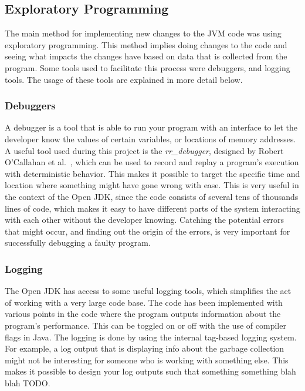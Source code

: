 

\subsection{Exploratory Programming}
The main method for implementing new changes to the JVM code was using exploratory programming. This method implies doing changes to the code and seeing what impacts the changes have based on data that is collected from the program. Some tools used to facilitate this process were debuggers, and logging tools. The usage of these tools are explained in more detail below.
\subsubsection{Debuggers}
A debugger is a tool that is able to run your program with an interface to let the developer know the values of certain variables, or locations of memory addresses. A useful tool used during this project is the \textit{rr\_debugger}, designed by Robert O'Callahan et al.~\cite{rrdebugger}, which can be used to record and replay a program's execution with deterministic behavior. This makes it possible to target the specific time and location where something might have gone wrong with ease. This is very useful in the context of the Open JDK, since the code consists of several tens of thousands lines of code, which makes it easy to have different parts of the system interacting with each other without the developer knowing. Catching the potential errors that might occur, and finding out the origin of the errors, is very important for successfully debugging a faulty program.

\subsubsection{Logging}
The Open JDK has access to some useful logging tools, which simplifies the act of working with a very large code base. The code has been implemented with various points in the code where the program outputs information about the program's performance. This can be toggled on or off with the use of compiler flags in Java. The logging is done by using the internal tag-based logging system. For example, a log output that is displaying info about the garbage collection might not be interesting for someone who is working with something else. This makes it possible to design your log outputs such that something something blah blah TODO.